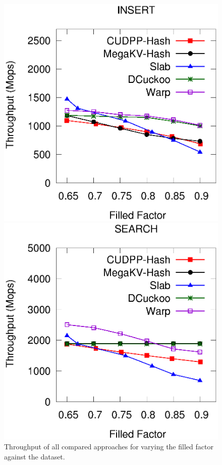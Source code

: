 %
\begin{figure}[t]
	\begin{minipage}{0.48\linewidth}\centering
		\includegraphics[width=\linewidth]{pic/static-load_factor/random/insert.eps}
		\centerline{}
	\end{minipage}
	\hfill
	\begin{minipage}{0.48\linewidth}\centering
		\includegraphics[width=\linewidth]{pic/static-load_factor/random/search.eps}
		\centerline{}
	\end{minipage}
	\caption{Throughput of all compared approaches for varying the filled factor against the \dsrandom dataset.}
	\label{fig:static-filled-factor}
\end{figure}

